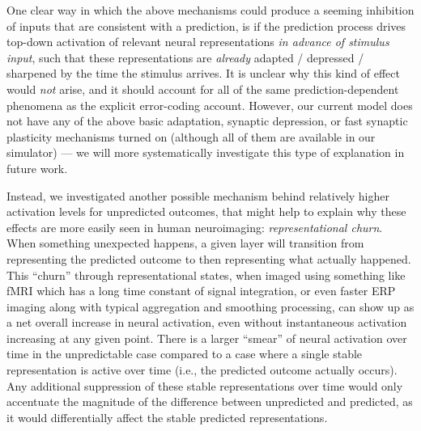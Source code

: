 \documentclass[11pt,twoside]{article}
\newif\myifpdf
\begin{document}
One clear way in which the above mechanisms could produce a seeming inhibition of inputs that are consistent with a prediction, is if the prediction process drives top-down activation of relevant neural representations {\em in advance of stimulus input}, such that these representations are {\em already} adapted / depressed / sharpened by the time the stimulus arrives.  It is unclear why this kind of effect would {\em not} arise, and it should account for all of the same prediction-dependent phenomena as the explicit error-coding account.  However, our current model does not have any of the above basic adaptation, synaptic depression, or fast synaptic plasticity mechanisms turned on (although all of them are available in our simulator) --- we will more systematically investigate this type of explanation in future work.

Instead, we investigated another possible mechanism behind relatively higher activation levels for unpredicted outcomes, that might help to explain why these effects are more easily seen in human neuroimaging: {\em representational churn}.  When something unexpected happens, a given layer will transition from representing the predicted outcome to then representing what actually happened.  This ``churn'' through representational states, when imaged using something like fMRI which has a long time constant of signal integration, or even faster ERP imaging along with typical aggregation and smoothing processing, can show up as a net overall increase in neural activation, even without instantaneous activation increasing at any given point.  There is a larger ``smear'' of neural activation over time in the unpredictable case compared to a case where a single stable representation is active over time (i.e., the predicted outcome actually occurs).  Any additional suppression of these stable representations over time would only accentuate the magnitude of the difference between unpredicted and predicted, as it would differentially affect the stable predicted representations.
\end{document}
